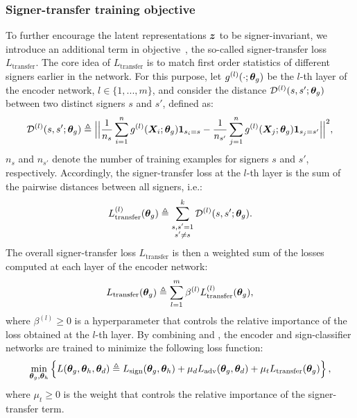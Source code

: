 \subsubsection{Signer-transfer training objective}
To further encourage the latent representations ${\bm{z}}$ to be signer-invariant, we introduce an additional term in objective~, the so-called signer-transfer loss $L_{\text{transfer}}$. The core idea of $L_{\text{transfer}}$ is to match first order statistics of different signers earlier in the network. For this purpose, let $g^{(l)}(\cdot;{\bm{\theta}}_g)$ be the $l$-th layer of the encoder network, $l \in \{1,...,m\}$, and consider the distance ${\mathcal{D}}^{(l)}(s, s'; {\bm{\theta}}_g)$ between two distinct signers $s$ and $s'$, defined as:
\begin{equation}
    \label{eq:sign_transfer_pairwise_loss}
    {\mathcal{D}}^{(l)}(s, s'; {\bm{\theta}}_g) \triangleq \Big|\Big| \frac{1}{n_s} \sum_{i=1}^n g^{(l)}({\bm{X}}_{i}; {\bm{\theta}}_g) \bm{1}_{s_i = s} - \frac{1}{n_{s'}}\sum_{j=1}^n g^{(l)}({\bm{X}}_{j}; {\bm{\theta}}_g) \bm{1}_{s_j = s'} \Big|\Big|^2,
\end{equation}
$n_s$ and $n_{s'}$ denote the number of training examples for signers $s$ and $s'$, respectively. Accordingly, the signer-transfer loss at the $l$-th layer is the sum of the pairwise distances between all signers, i.e.:
\begin{equation}
    L_{\text{transfer}}^{(l)}({\bm{\theta}}_g) \triangleq \sum_{\substack{s,s'=1 \\ s' \neq s}}^k {\mathcal{D}}^{(l)}(s,s'; {\bm{\theta}}_g).
\end{equation}
The overall signer-transfer loss $L_{\text{transfer}}$ is then a weighted sum of the losses computed at each layer of the encoder network:
\begin{equation}
    \label{eq:signer_transfer_loss}
    L_{\text{transfer}}({\bm{\theta}}_g) \triangleq \sum_{l=1}^{m} \beta^{(l)} L_{\text{transfer}}^{(l)}({\bm{\theta}}_g),
\end{equation}
where $\beta^{(l)}\geq 0$ is a hyperparameter that controls the relative importance of the loss obtained at the $l$-th layer.
By combining  and , the encoder and sign-classifier networks are trained to minimize the following loss function:
\begin{equation}
    \label{eq:enc_sign_loss}
    \min_{{\bm{\theta}}_g, {\bm{\theta}}_h} \left\lbrace L({\bm{\theta}}_g, {\bm{\theta}}_h, {\bm{\theta}}_d) \triangleq L_{\text{sign}}({\bm{\theta}}_g, {\bm{\theta}}_h) + \mu_d L_{\text{adv}}({\bm{\theta}}_g, {\bm{\theta}}_d) +
    \mu_t L_{\text{transfer}}({\bm{\theta}}_g) \right\rbrace,
\end{equation}
where $\mu_t \geq 0$ is the weight that controls the relative importance of the signer-transfer term.

